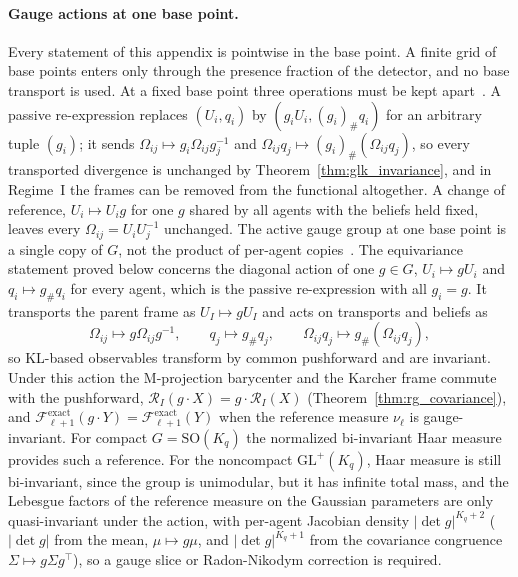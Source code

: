 \paragraph{Gauge actions at one base point.}
Every statement of this appendix is pointwise in the base point. A finite grid of base points enters only through the presence fraction of the detector, and no base transport is used. At a fixed base point three operations must be kept apart~\cite[Ch.~2]{DennisGaugeVFE2026}. A passive re-expression replaces $(U_i,q_i)$ by $(g_iU_i,(g_i)_\#q_i)$ for an arbitrary tuple $(g_i)$; it sends $\Omega_{ij}\mapsto g_i\Omega_{ij}g_j^{-1}$ and $\Omega_{ij}q_j\mapsto(g_i)_\#(\Omega_{ij}q_j)$, so every transported divergence is unchanged by Theorem~\ref{thm:glk_invariance}, and in Regime~I the frames can be removed from the functional altogether. A change of reference, $U_i\mapsto U_ig$ for one $g$ shared by all agents with the beliefs held fixed, leaves every $\Omega_{ij}=U_iU_j^{-1}$ unchanged. The active gauge group at one base point is a single copy of $G$, not the product of per-agent copies~\cite[Ch.~2]{DennisGaugeVFE2026}. The equivariance statement proved below concerns the diagonal action of one $g\in G$, $U_i\mapsto gU_i$ and $q_i\mapsto g_\#q_i$ for every agent, which is the passive re-expression with all $g_i=g$. It transports the parent frame as $U_I\mapsto gU_I$ and acts on transports and beliefs as
\begin{equation}
\Omega_{ij} \mapsto g \Omega_{ij} g^{-1}, \qquad q_j \mapsto g_\# q_j, \qquad \Omega_{ij} q_j \mapsto g_\#(\Omega_{ij} q_j),
\end{equation}
so KL-based observables transform by common pushforward and are invariant. Under this action the M-projection barycenter and the Karcher frame commute with the pushforward, $\mathcal{R}_I(g \cdot X) = g \cdot \mathcal{R}_I(X)$ (Theorem~\ref{thm:rg_covariance}), and $\mathcal{F}^{\mathrm{exact}}_{\ell+1}(g \cdot Y) = \mathcal{F}^{\mathrm{exact}}_{\ell+1}(Y)$ when the reference measure $\nu_\ell$ is gauge-invariant. For compact $G = \mathrm{SO}(K_q)$ the normalized bi-invariant Haar measure provides such a reference. For the noncompact $\mathrm{GL}^+(K_q)$, Haar measure is still bi-invariant, since the group is unimodular, but it has infinite total mass, and the Lebesgue factors of the reference measure on the Gaussian parameters are only quasi-invariant under the action, with per-agent Jacobian density $|\det g|^{K_q+2}$ ($|\det g|$ from the mean, $\mu \mapsto g\mu$, and $|\det g|^{K_q+1}$ from the covariance congruence $\Sigma \mapsto g\Sigma g^\top$), so a gauge slice or Radon-Nikodym correction is required.

